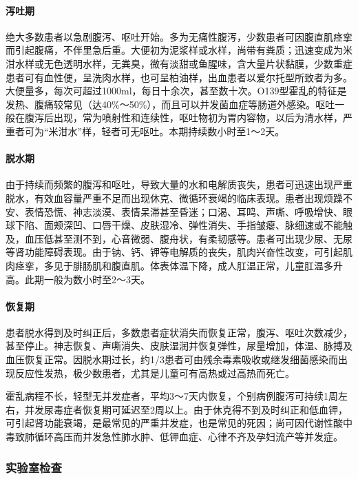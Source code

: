 \paragraph{泻吐期}

绝大多数患者以急剧腹泻、呕吐开始。多为无痛性腹泻，少数患者可因腹直肌痉挛而引起腹痛，不伴里急后重。大便初为泥浆样或水样，尚带有粪质；迅速变成为米泔水样或无色透明水样，无粪臭，微有淡甜或鱼腥味，含大量片状黏膜，少数重症患者可有血性便，呈洗肉水样，也可呈柏油样，出血患者以爱尔托型所致者为多。大便量多，每次可超过1000ml，每日十余次，甚至数十次。O139型霍乱的特征是发热、腹痛较常见（达40\%～50\%），而且可以并发菌血症等肠道外感染。呕吐一般在腹泻后出现，常为喷射性和连续性，呕吐物初为胃内容物，以后为清水样，严重者可为“米泔水”样，轻者可无呕吐。本期持续数小时至1～2天。

\paragraph{脱水期}

由于持续而频繁的腹泻和呕吐，导致大量的水和电解质丧失，患者可迅速出现严重脱水，有效血容量严重不足而出现休克、微循环衰竭的临床表现。患者出现烦躁不安、表情恐慌、神志淡漠、表情呆滞甚至昏迷；口渴、耳鸣、声嘶、呼吸增快、眼球下陷、面颊深凹、口唇干燥、皮肤湿冷、弹性消失、手指皱瘪、脉细速或不能触及，血压低甚至测不到，心音微弱、腹舟状，有柔韧感等。患者可出现少尿、无尿等肾功能障碍表现。由于钠、钙、钾等电解质的丧失，肌肉兴奋性改变，可引起肌肉痉挛，多见于腓肠肌和腹直肌。体表体温下降，成人肛温正常，儿童肛温多升高。此期一般为数小时至2～3天。

\paragraph{恢复期}

患者脱水得到及时纠正后，多数患者症状消失而恢复正常，腹泻、呕吐次数减少，甚至停止。神志恢复、声嘶消失、皮肤湿润并恢复弹性，尿量增加，体温、脉搏及血压恢复正常。因脱水期过长，约1/3患者可由残余毒素吸收或继发细菌感染而出现反应性发热，极少数患者，尤其是儿童可有高热或过高热而死亡。

霍乱病程不长，轻型无并发症者，平均3～7天内恢复，个别病例腹泻可持续1周左右，并发尿毒症者恢复期可延迟至2周以上。由于休克得不到及时纠正和低血钾，可引起肾功能衰竭，是最常见的严重并发症，也是常见的死因；尚可因代谢性酸中毒致肺循环高压而并发急性肺水肿、低钾血症、心律不齐及孕妇流产等并发症。

\subsubsection{实验室检查}

